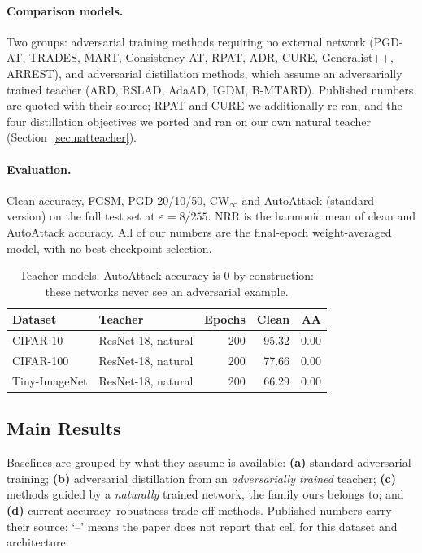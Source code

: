 \paragraph{Comparison models.} Two groups: adversarial training methods requiring no external network
(PGD-AT, TRADES, MART, Consistency-AT, RPAT, ADR, CURE, Generalist++, ARREST), and adversarial
distillation methods, which assume an adversarially trained teacher (ARD, RSLAD, AdaAD, IGDM,
B-MTARD). Published numbers are quoted with their source; RPAT and CURE we additionally re-ran, and
the four distillation objectives we ported and ran on our own natural teacher
(Section~\ref{sec:natteacher}).

\paragraph{Evaluation.} Clean accuracy, FGSM, PGD-20/10/50, CW$_\infty$ and AutoAttack (standard
version) on the full test set at $\varepsilon=8/255$. NRR is the harmonic mean of clean and AutoAttack
accuracy. All of our numbers are the final-epoch weight-averaged model, with no best-checkpoint
selection.

\begin{table}[t]
  \centering
  \caption{Teacher models. AutoAttack accuracy is $0$ by construction: these networks never see an
  adversarial example.}
  \label{tab:teachers}
  \begin{tabular}{llrrr}
    \toprule
    Dataset & Teacher & Epochs & Clean & AA \\
    \midrule
    CIFAR-10      & ResNet-18, natural & 200 & 95.32 & 0.00 \\
    CIFAR-100     & ResNet-18, natural & 200 & 77.66 & 0.00 \\
    Tiny-ImageNet & ResNet-18, natural & 200 & 66.29 & 0.00 \\
    \bottomrule
  \end{tabular}
\end{table}

\subsection{Main Results}

Baselines are grouped by what they assume is available: \textbf{(a)} standard adversarial
training; \textbf{(b)} adversarial distillation from an \emph{adversarially trained} teacher;
\textbf{(c)} methods guided by a \emph{naturally} trained network, the family ours belongs to; and
\textbf{(d)} current accuracy--robustness trade-off methods. Published numbers carry their source;
`--' means the paper does not report that cell for this dataset and architecture.

